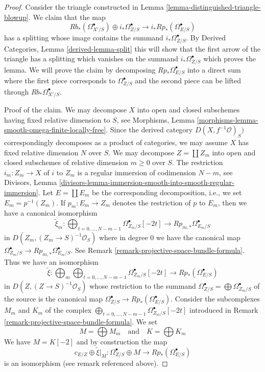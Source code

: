 \begin{proof}
Consider the triangle constructed in
Lemma \ref{lemma-distinguished-triangle-blowup}.
We claim that the map
$$
Rb_*(\Omega^\bullet_{X'/S}) \oplus i_*\Omega^\bullet_{Z/S} \to
i_*Rp_*(\Omega^\bullet_{E/S})
$$
has a splitting whose image contains the summand $i_*\Omega^\bullet_{Z/S}$.
By Derived Categories, Lemma \ref{derived-lemma-split} this will show that
the first arrow of the triangle has a splitting which vanishes on
the summand $i_*\Omega^\bullet_{Z/S}$ which proves the lemma.
We will prove the claim by decomposing $Rp_*\Omega^\bullet_{E/S}$
into a direct sum where the first piece corresponds to
$\Omega^\bullet_{Z/S}$ and the second piece can be lifted
through $Rb_*\Omega^\bullet_{X'/S}$.

\medskip\noindent
Proof of the claim. We may decompose $X$ into open and closed subschemes
having fixed relative dimension to $S$, see
Morphisms, Lemma \ref{morphisms-lemma-smooth-omega-finite-locally-free}.
Since the derived category $D(X, f^{-1}\mathcal{O})_S)$ correspondingly
decomposes as a product of categories, we may assume $X$ has
fixed relative dimension $N$ over $S$. We may decompose
$Z = \coprod Z_m$ into open and closed subschemes of relative
dimension $m \geq 0$ over $S$. The restriction $i_m : Z_m \to X$ of
$i$ to $Z_m$ is a regular immersion of codimension $N - m$, see Divisors, Lemma
\ref{divisors-lemma-immersion-smooth-into-smooth-regular-immersion}.
Let $E = \coprod E_m$ be the corresponding decomposition, i.e.,
we set $E_m = p^{-1}(Z_m)$. If $p_m : E_m \to Z_m$ denotes the
restriction of $p$ to $E_m$, then we have a canonical isomorphism
$$
\tilde \xi_m :
\bigoplus\nolimits_{t = 0, \ldots, N - m - 1}
\Omega^\bullet_{Z_m/S}[-2t]
\longrightarrow
Rp_{m, *}\Omega^\bullet_{E_m/S}
$$
in $D(Z_m, (Z_m \to S)^{-1}\mathcal{O}_S)$
where in degree $0$ we have the canonical map
$\Omega^\bullet_{Z_m/S} \to Rp_{m, *}\Omega^\bullet_{E_m/S}$.
See Remark \ref{remark-projective-space-bundle-formula}.
Thus we have an isomorphism
$$
\tilde \xi :
\bigoplus\nolimits_m
\bigoplus\nolimits_{t = 0, \ldots, N - m - 1}
\Omega^\bullet_{Z_m/S}[-2t]
\longrightarrow
Rp_*(\Omega^\bullet_{E/S})
$$
in $D(Z, (Z \to S)^{-1}\mathcal{O}_S)$
whose restriction to the summand
$\Omega^\bullet_{Z/S} = \bigoplus \Omega^\bullet_{Z_m/S}$ of the source
is the canonical map $\Omega^\bullet_{Z/S} \to Rp_*(\Omega^\bullet_{E/S})$.
Consider the subcomplexes $M_m$ and $K_m$ of the complex
$\bigoplus\nolimits_{t = 0, \ldots, N - m - 1} \Omega^\bullet_{Z_m/S}[-2t]$
introduced in Remark \ref{remark-projective-space-bundle-formula}.
We set
$$
M = \bigoplus M_m
\quad\text{and}\quad
K = \bigoplus K_m
$$
We have $M = K[-2]$ and by construction the map
$$
c_{E/Z} \oplus \tilde \xi|_M :
\Omega^\bullet_{Z/S} \oplus M
\longrightarrow
Rp_*(\Omega^\bullet_{E/S})
$$
is an isomorphism (see remark referenced above).


\end{proof}

